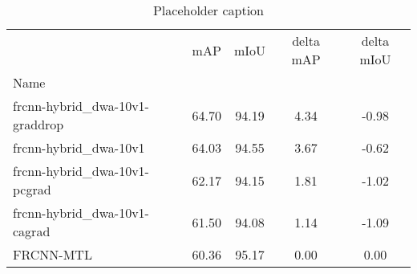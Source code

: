 \begin{table}[htbp]
\centering
\caption{Placeholder caption}
\label{tab:dwa-grad-constant}
\begin{tabular}{lcccc}
\toprule
 & mAP & mIoU & delta mAP & delta mIoU \\
Name &  &  &  &  \\
\midrule
frcnn-hybrid_dwa-10v1-graddrop & 64.70 & 94.19 & 4.34 & -0.98 \\
frcnn-hybrid_dwa-10v1 & 64.03 & 94.55 & 3.67 & -0.62 \\
frcnn-hybrid_dwa-10v1-pcgrad & 62.17 & 94.15 & 1.81 & -1.02 \\
frcnn-hybrid_dwa-10v1-cagrad & 61.50 & 94.08 & 1.14 & -1.09 \\
FRCNN-MTL & 60.36 & 95.17 & 0.00 & 0.00 \\
\bottomrule
\end{tabular}
\end{table}
